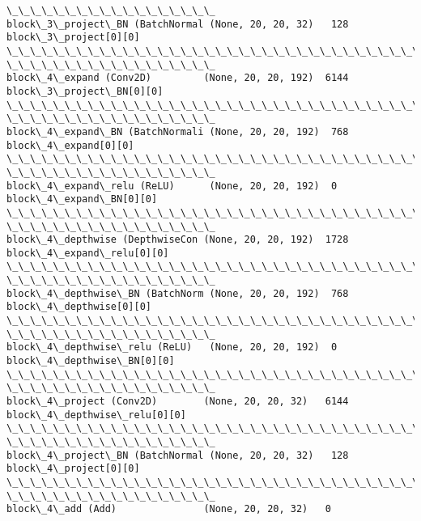 \documentclass[11pt]{article}
\begin{document}
\begin{Verbatim}[commandchars=\\\{\}]
\_\_\_\_\_\_\_\_\_\_\_\_\_\_\_\_\_\_
block\_3\_project\_BN (BatchNormal (None, 20, 20, 32)   128
block\_3\_project[0][0]
\_\_\_\_\_\_\_\_\_\_\_\_\_\_\_\_\_\_\_\_\_\_\_\_\_\_\_\_\_\_\_\_\_\_\_\_\_\_\_\_\_\_\_\_\_\_\_\_\_\_\_\_\_\_\_\_\_\_\_\_\_\_\_\_\_\_\_\_\_\_\_\_\_\_\_\_\_\_\_\_
\_\_\_\_\_\_\_\_\_\_\_\_\_\_\_\_\_\_
block\_4\_expand (Conv2D)         (None, 20, 20, 192)  6144
block\_3\_project\_BN[0][0]
\_\_\_\_\_\_\_\_\_\_\_\_\_\_\_\_\_\_\_\_\_\_\_\_\_\_\_\_\_\_\_\_\_\_\_\_\_\_\_\_\_\_\_\_\_\_\_\_\_\_\_\_\_\_\_\_\_\_\_\_\_\_\_\_\_\_\_\_\_\_\_\_\_\_\_\_\_\_\_\_
\_\_\_\_\_\_\_\_\_\_\_\_\_\_\_\_\_\_
block\_4\_expand\_BN (BatchNormali (None, 20, 20, 192)  768
block\_4\_expand[0][0]
\_\_\_\_\_\_\_\_\_\_\_\_\_\_\_\_\_\_\_\_\_\_\_\_\_\_\_\_\_\_\_\_\_\_\_\_\_\_\_\_\_\_\_\_\_\_\_\_\_\_\_\_\_\_\_\_\_\_\_\_\_\_\_\_\_\_\_\_\_\_\_\_\_\_\_\_\_\_\_\_
\_\_\_\_\_\_\_\_\_\_\_\_\_\_\_\_\_\_
block\_4\_expand\_relu (ReLU)      (None, 20, 20, 192)  0
block\_4\_expand\_BN[0][0]
\_\_\_\_\_\_\_\_\_\_\_\_\_\_\_\_\_\_\_\_\_\_\_\_\_\_\_\_\_\_\_\_\_\_\_\_\_\_\_\_\_\_\_\_\_\_\_\_\_\_\_\_\_\_\_\_\_\_\_\_\_\_\_\_\_\_\_\_\_\_\_\_\_\_\_\_\_\_\_\_
\_\_\_\_\_\_\_\_\_\_\_\_\_\_\_\_\_\_
block\_4\_depthwise (DepthwiseCon (None, 20, 20, 192)  1728
block\_4\_expand\_relu[0][0]
\_\_\_\_\_\_\_\_\_\_\_\_\_\_\_\_\_\_\_\_\_\_\_\_\_\_\_\_\_\_\_\_\_\_\_\_\_\_\_\_\_\_\_\_\_\_\_\_\_\_\_\_\_\_\_\_\_\_\_\_\_\_\_\_\_\_\_\_\_\_\_\_\_\_\_\_\_\_\_\_
\_\_\_\_\_\_\_\_\_\_\_\_\_\_\_\_\_\_
block\_4\_depthwise\_BN (BatchNorm (None, 20, 20, 192)  768
block\_4\_depthwise[0][0]
\_\_\_\_\_\_\_\_\_\_\_\_\_\_\_\_\_\_\_\_\_\_\_\_\_\_\_\_\_\_\_\_\_\_\_\_\_\_\_\_\_\_\_\_\_\_\_\_\_\_\_\_\_\_\_\_\_\_\_\_\_\_\_\_\_\_\_\_\_\_\_\_\_\_\_\_\_\_\_\_
\_\_\_\_\_\_\_\_\_\_\_\_\_\_\_\_\_\_
block\_4\_depthwise\_relu (ReLU)   (None, 20, 20, 192)  0
block\_4\_depthwise\_BN[0][0]
\_\_\_\_\_\_\_\_\_\_\_\_\_\_\_\_\_\_\_\_\_\_\_\_\_\_\_\_\_\_\_\_\_\_\_\_\_\_\_\_\_\_\_\_\_\_\_\_\_\_\_\_\_\_\_\_\_\_\_\_\_\_\_\_\_\_\_\_\_\_\_\_\_\_\_\_\_\_\_\_
\_\_\_\_\_\_\_\_\_\_\_\_\_\_\_\_\_\_
block\_4\_project (Conv2D)        (None, 20, 20, 32)   6144
block\_4\_depthwise\_relu[0][0]
\_\_\_\_\_\_\_\_\_\_\_\_\_\_\_\_\_\_\_\_\_\_\_\_\_\_\_\_\_\_\_\_\_\_\_\_\_\_\_\_\_\_\_\_\_\_\_\_\_\_\_\_\_\_\_\_\_\_\_\_\_\_\_\_\_\_\_\_\_\_\_\_\_\_\_\_\_\_\_\_
\_\_\_\_\_\_\_\_\_\_\_\_\_\_\_\_\_\_
block\_4\_project\_BN (BatchNormal (None, 20, 20, 32)   128
block\_4\_project[0][0]
\_\_\_\_\_\_\_\_\_\_\_\_\_\_\_\_\_\_\_\_\_\_\_\_\_\_\_\_\_\_\_\_\_\_\_\_\_\_\_\_\_\_\_\_\_\_\_\_\_\_\_\_\_\_\_\_\_\_\_\_\_\_\_\_\_\_\_\_\_\_\_\_\_\_\_\_\_\_\_\_
\_\_\_\_\_\_\_\_\_\_\_\_\_\_\_\_\_\_
block\_4\_add (Add)               (None, 20, 20, 32)   0

\end{Verbatim}
\end{document}
